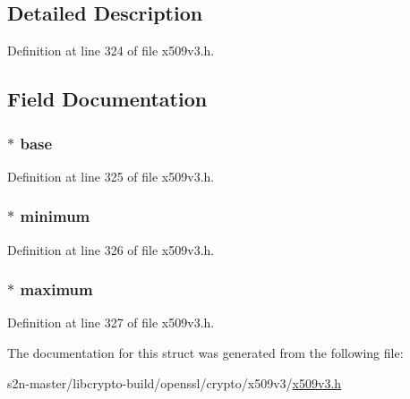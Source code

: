 \subsection{Detailed Description}


Definition at line 324 of file x509v3.\+h.



\subsection{Field Documentation}
\subsubsection[{\texorpdfstring{base}{base}}]{ $\ast$ base}\hypertarget{struct_g_e_n_e_r_a_l___s_u_b_t_r_e_e__st_a14f134807ede76c5a1a8643b3fdcdb5a}{}\label{struct_g_e_n_e_r_a_l___s_u_b_t_r_e_e__st_a14f134807ede76c5a1a8643b3fdcdb5a}


Definition at line 325 of file x509v3.\+h.

\subsubsection[{\texorpdfstring{minimum}{minimum}}]{ $\ast$ minimum}\hypertarget{struct_g_e_n_e_r_a_l___s_u_b_t_r_e_e__st_a8c928e7cf26fef65fcff9689c40d6ad9}{}\label{struct_g_e_n_e_r_a_l___s_u_b_t_r_e_e__st_a8c928e7cf26fef65fcff9689c40d6ad9}


Definition at line 326 of file x509v3.\+h.

\subsubsection[{\texorpdfstring{maximum}{maximum}}]{ $\ast$ maximum}\hypertarget{struct_g_e_n_e_r_a_l___s_u_b_t_r_e_e__st_a0b61f3bba3ce191a5fc7b6e2965e7e07}{}\label{struct_g_e_n_e_r_a_l___s_u_b_t_r_e_e__st_a0b61f3bba3ce191a5fc7b6e2965e7e07}


Definition at line 327 of file x509v3.\+h.



The documentation for this struct was generated from the following file\+:\begin{DoxyCompactItemize}
\item 
s2n-\/master/libcrypto-\/build/openssl/crypto/x509v3/\hyperlink{crypto_2x509v3_2x509v3_8h}{x509v3.\+h}\end{DoxyCompactItemize}
